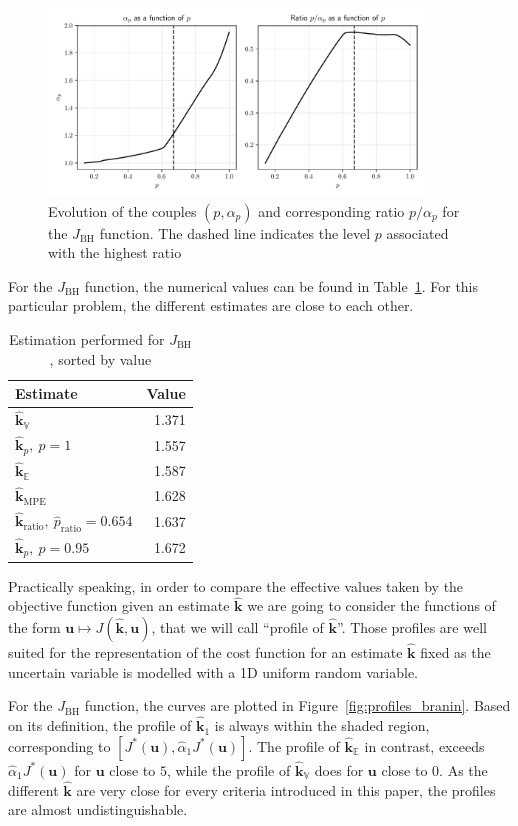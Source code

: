 \documentclass[preprint, 1p]{elsarticle}
\newcommand{\Ex}{\mathbb{E}}
\newcommand{\hatkmean}{\hat{\mathbf{k}}_{\Ex}}
\newcommand{\hatkvar}{\hat{\mathbf{k}}_{\mathbb{V}}}
\newcommand{\hatkmpe}{\hat{\mathbf{k}}_{\mathrm{MPE}}}
\newcommand{\kest}{\hat{\mathbf{k}}}
\newcommand{\checkap}{{\alpha}_p}
\newcommand{\checka}{{\alpha}}
\newcommand{\checkk}{\mathbf{k}}
\begin{document}
 \begin{figure}[!ht]
   \centering
\includegraphics[width=10cm]{Figures/alpha_p_BH.pdf}
\caption{Evolution of the couples $(p,\checkap)$ and corresponding ratio $p/\checkap$ for the $J_{\mathrm{BH}}$ function. The dashed line indicates the level $p$ associated with the highest ratio}
\label{fig:ratio_BH}
\end{figure}
 
 For the $J_{\mathrm{BH}}$ function, the numerical values can be found in Table~\ref{tab:recap_estimates_branin}. For this particular problem, the different estimates are close to each other.
 
\begin{table}[!ht]
\centering
\caption{Estimation performed for $J_{\mathrm{BH}}$, sorted by value}
\label{tab:recap_estimates_branin}
\begin{tabular}{lr}
\toprule
Estimate & Value \\ \midrule
$\hatkvar$ & 1.371 \\ 
$\kest_p,~p=1$ & 1.557 \\ 
$\hatkmean$ & 1.587 \\ 
  $\hatkmpe$ & 1.628 \\
  $\kest_{\mathrm{ratio}},~\hat{p}_{\mathrm{ratio}}=0.654$ & 1.637 \\
$\kest_p,~p=0.95$ & 1.672 \\ \bottomrule
\end{tabular}
\end{table}

Practically speaking, in order to compare the effective values taken by the objective function given an estimate $\kest$ we are going to consider the functions of the form $\mathbf{u} \mapsto J(\kest,\mathbf{u})$, that we will call ``profile of $\kest$''. Those profiles are well suited for the representation of the cost function for an estimate $\kest$ fixed as the uncertain variable is modelled with a 1D uniform random variable.

For the $J_{\mathrm{BH}}$ function, the curves are plotted in Figure~\ref{fig:profiles_branin}. Based on its definition, the profile of $\hat{\checkk}_1$ is always within the shaded region, corresponding to $[J^*(\mathbf{u}), \hat{\checka}_1 J^*(\mathbf{u})]$. The profile of $\hatkmean$ in contrast, exceeds $\hat{\checka}_1 J^*(\mathbf{u})$ for $\mathbf{u}$ close to $5$, while the profile of $\hatkvar$ does for $\mathbf{u}$ close to $0$.
As the different $\kest$ are very close for every criteria introduced in this paper, the profiles are almost undistinguishable.
\end{document}
